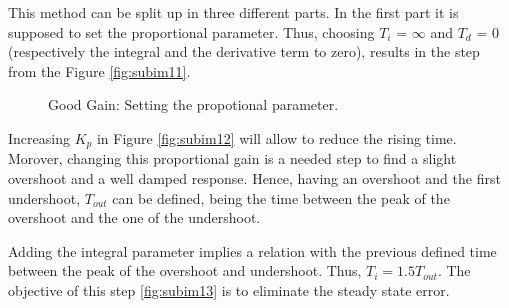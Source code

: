 This method can be split up in three different parts. In the first part it is supposed to set the proportional parameter. Thus, choosing $T_i$ = $\infty$ and $T_d$ = 0 (respectively the integral and the derivative term to zero), results in the step from the Figure \ref{fig:subim11}.
\begin{figure}[H]
\hfill
{}
\hfill
{}

\caption{Good Gain: Setting the propotional parameter.}
\end{figure}


Increasing $K_p$ in Figure \ref{fig:subim12} will allow to reduce the rising time. Morover, changing this proportional gain is a needed step to find a slight overshoot and a well damped response. Hence, having an overshoot and the first undershoot, $T_{out}$ can be defined, being the time between the peak of the overshoot and the one of the undershoot.\par
\vspace{5mm}
Adding the integral parameter implies a relation with the previous defined time between the peak of the overshoot and undershoot. Thus, $T_i = 1.5T_{out}$. The objective of this step \ref{fig:subim13} is to eliminate the steady state error.



